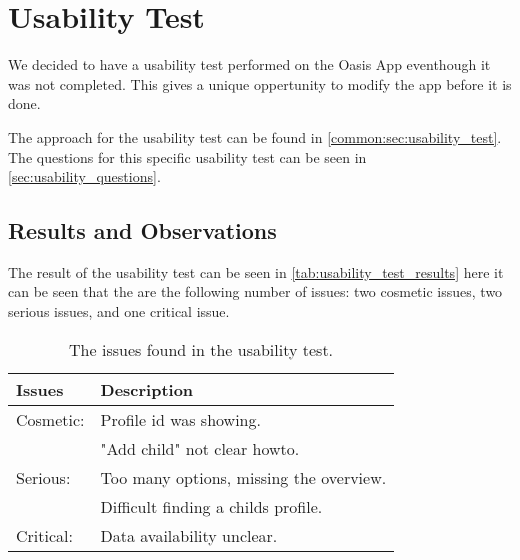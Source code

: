 \section{Usability Test}
We decided to have a usability test performed on the Oasis App eventhough it was not completed.
This gives a unique oppertunity to modify the app before it is done.

The approach for the usability test can be found in \autoref{common:sec:usability_test}.
The questions for this specific usability test can be seen in \autoref{sec:usability_questions}.

\subsection{Results and Observations}
\label{sec:usability_results}
The result of the usability test can be seen in \autoref{tab:usability_test_results} here it can be seen that the are the following number of issues:
two cosmetic issues, two serious issues, and one critical issue.

\begin{table}[htbp]
	\centering
		\begin{tabular}{| p{4.5cm} | m{9cm} |}
			\hline
			\textbf{Issues} & \textbf{Description} \\ \hline
			
			Cosmetic:		& Profile id was showing. \\ 
							& "Add child" not clear howto. \\ \hline
							
			Serious:		& Too many options, missing the overview. \\
							& Difficult finding a childs profile. \\ \hline
						
			Critical: 		& Data availability unclear. \\ \hline
		\end{tabular}
	\caption{The issues found in the usability test.}
	\label{tab:usability_test_results}
\end{table}